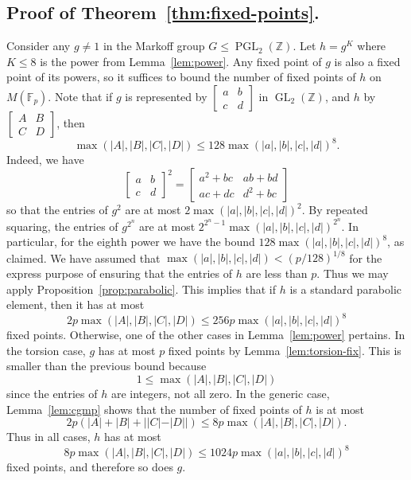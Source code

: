 \documentclass[10pt]{amsart}
\theoremstyle{definition}\newtheorem{defi}[theo]{Definition}\newtheorem{rema}[theo]{Remark}\newtheorem{exam}[theo]{Example}\newtheorem{exem}[theo]{Example}\newtheorem{nota}[theo]{Notation}
\newcommand{\Z}{\mathbb{Z}}
\newcommand{\F}{\mathbb{F}}
\DeclareMathOperator{\GL}{GL}
\DeclareMathOperator{\PGL}{PGL}
\begin{document}
\subsection{Proof of Theorem~\ref{thm:fixed-points}.} Consider any $g \neq 1$ in the Markoff group $G \leq \PGL_2(\Z)$. Let $h = g^K$ where $K \leq 8$ is the power from Lemma~\ref{lem:power}. Any fixed point of $g$ is also a fixed point of its powers, so it suffices to bound the number of fixed points of $h$ on $M(\F_p)$. Note that if $g$ is represented by $\left[
\begin{smallmatrix}
a & b \\ c & d
\end{smallmatrix}\right]$ in $\GL_2(\Z)$, and $h$ by $\left[
\begin{smallmatrix} A & B \\ C & D
\end{smallmatrix}\right]$, then
\[
\max(|A|,|B|,|C|,|D|) \leq 128 \max(|a|,|b|,|c|,|d|)^8.
\]
Indeed, we have
\[
\begin{bmatrix} a & b \\ c & d
\end{bmatrix}^2 =
\begin{bmatrix} a^2+bc & ab+bd \\ ac+dc & d^2+bc
\end{bmatrix}
\]
so that the entries of $g^2$ are at most $2\max(|a|,|b|,|c|,|d|)^2$. By repeated squaring, the entries of $g^{2^n}$ are at most $2^{2^n-1} \max(|a|,|b|,|c|,|d|)^{2^n}$. In particular, for the eighth power we have the bound $128 \max(|a|,|b|,|c|,|d|)^8$, as claimed. We have assumed that $\max(|a|,|b|,|c|,|d|) < (p/128)^{1/8}$ for the express purpose of ensuring that the entries of $h$ are less than $p$. Thus we may apply Proposition~\ref{prop:parabolic}. This implies that if $h$ is a standard parabolic element, then it has at most
\[
2p\max(|A|,|B|,|C|,|D|) \leq 256 p \max(|a|,|b|,|c|,|d|)^8
\]
fixed points. Otherwise, one of the other cases in Lemma~\ref{lem:power} pertains. In the torsion case, $g$ has at most $p$ fixed points by Lemma~\ref{lem:torsion-fix}. This is smaller than the previous bound because
\[
1 \leq \max(|A|,|B|,|C|,|D|)
\]
since the entries of $h$ are integers, not all zero. In the generic case, Lemma~\ref{lem:cgmp} shows that the number of fixed points of $h$ is at most
\[
2p(|A| + |B| + | |C| - |D| |) \leq 8p \max(|A|,|B|,|C|,|D|).
\]
Thus in all cases, $h$ has at most
\[
8p \max(|A|,|B|,|C|,|D|) \leq 1024 p \max(|a|,|b|,|c|,|d|)^8
\]
fixed points, and therefore so does $g$.
\end{document}
